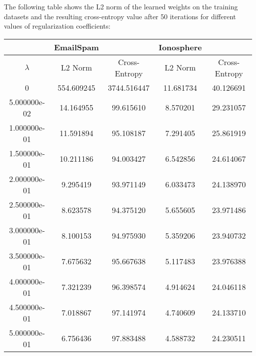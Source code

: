 \documentclass[12pt]{article}
\begin{document}
\begin{enumerate}[label=\alph*.]
	The following table shows the L2 norm of the learned weights on the training datasets and the resulting cross-entropy value after 50 iterations for different values of regularization coefficients:

	\begin{center}
	\begin{tabular}{| c | c | c | c | c |}
		\hline
		  & \textbf{EmailSpam} &   & \textbf{Ionosphere} &  \\
		\hline
	    	$\lambda$ & L2 Norm & Cross-Entropy & L2 Norm & Cross-Entropy \\
		\hline \hline
		0 & 554.609245 & 3744.516447 & 11.681734 & 40.126691 \\
		\hline
		5.000000e-02 & 14.164955 & 99.615610 & 8.570201 & 29.231057 \\
		\hline
		1.000000e-01 & 11.591894 & 95.108187 & 7.291405 & 25.861919 \\
		\hline
		1.500000e-01 & 10.211186 & 94.003427 & 6.542856 & 24.614067 \\
		\hline
		2.000000e-01 & 9.295419 & 93.971149 & 6.033473 & 24.138970 \\
		\hline
		2.500000e-01 & 8.623578 & 94.375120 & 5.655605 & 23.971486 \\
		\hline
		3.000000e-01 & 8.100153 & 94.975930 & 5.359206 & 23.940732 \\
		\hline
		3.500000e-01 & 7.675632 & 95.667638 & 5.117483 & 23.976388 \\
		\hline
		4.000000e-01 & 7.321239 & 96.398574 & 4.914624 & 24.046118 \\
		\hline
		4.500000e-01 & 7.018867 & 97.141974 & 4.740609 & 24.133710 \\
		\hline
		5.000000e-01 & 6.756436 & 97.883488 & 4.588732 & 24.230511 \\
		\hline
	    \end{tabular}
	\end{center}

\end{enumerate}
\end{document}
